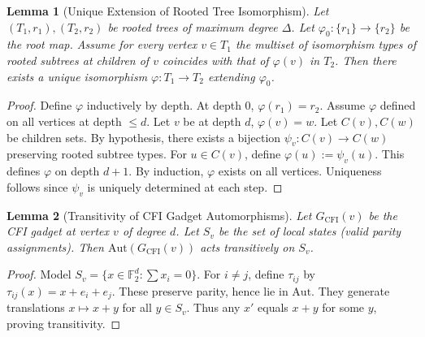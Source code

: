 \documentclass[11pt]{article}
\newtheorem{lemma}{Lemma}
\begin{document}
\begin{lemma}[Unique Extension of Rooted Tree Isomorphism]
Let $(T_1,r_1),(T_2,r_2)$ be rooted trees of maximum degree $\Delta$.
Let $\varphi_0:\{r_1\}\to\{r_2\}$ be the root map.
Assume for every vertex $v\in T_1$ the multiset of isomorphism types of rooted subtrees at children of $v$
coincides with that of $\varphi(v)$ in $T_2$.
Then there exists a unique isomorphism $\varphi:T_1\to T_2$ extending $\varphi_0$.
\end{lemma}

\begin{proof}
Define $\varphi$ inductively by depth. At depth $0$, $\varphi(r_1)=r_2$.
Assume $\varphi$ defined on all vertices at depth $\le d$.
Let $v$ be at depth $d$, $\varphi(v)=w$.
Let $C(v),C(w)$ be children sets. By hypothesis, there exists a bijection
$\psi_v:C(v)\to C(w)$ preserving rooted subtree types.
For $u\in C(v)$, define $\varphi(u):=\psi_v(u)$.
This defines $\varphi$ on depth $d+1$.
By induction, $\varphi$ exists on all vertices.
Uniqueness follows since $\psi_v$ is uniquely determined at each step.
\end{proof}

\begin{lemma}[Transitivity of CFI Gadget Automorphisms]
Let $G_{\mathrm{CFI}}(v)$ be the CFI gadget at vertex $v$ of degree $d$.
Let $S_v$ be the set of local states (valid parity assignments).
Then $\mathrm{Aut}(G_{\mathrm{CFI}}(v))$ acts transitively on $S_v$.
\end{lemma}

\begin{proof}
Model $S_v=\{x\in\mathbb{F}_2^d:\sum x_i=0\}$.
For $i\neq j$, define $\tau_{ij}$ by $\tau_{ij}(x)=x+e_i+e_j$.
These preserve parity, hence lie in $\mathrm{Aut}$.
They generate translations $x\mapsto x+y$ for all $y\in S_v$.
Thus any $x'$ equals $x+y$ for some $y$, proving transitivity.
\end{proof}
\end{document}
